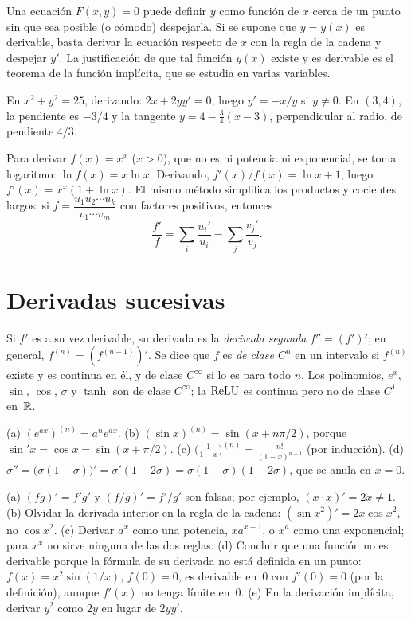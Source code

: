 Una ecuación $F(x,y)=0$ puede definir $y$ como función de $x$ cerca de un punto sin que sea posible (o cómodo) despejarla. Si se supone que $y=y(x)$ es derivable, basta derivar la ecuación respecto de $x$ con la regla de la cadena y despejar $y'$. La justificación de que tal función $y(x)$ existe y es derivable es el teorema de la función implícita, que se estudia en varias variables.

\begin{ejemplo}[Circunferencia]\label{ej:implicita}
En $x^{2}+y^{2}=25$, derivando: $2x+2yy'=0$, luego $y'=-x/y$ si $y\ne0$. En $(3,4)$, la pendiente es $-3/4$ y la tangente $y=4-\tfrac34(x-3)$, perpendicular al radio, de pendiente $4/3$.
\end{ejemplo}

\begin{ejemplo}\label{ej:logaritmica}
Para derivar $f(x)=x^{x}$ ($x>0$), que no es ni potencia ni exponencial, se toma logaritmo: $\ln f(x)=x\ln x$. Derivando, $f'(x)/f(x)=\ln x+1$, luego $f'(x)=x^{x}(1+\ln x)$. El mismo método simplifica los productos y cocientes largos: si $f=\dfrac{u_1u_2\cdots u_k}{v_1\cdots v_m}$ con factores positivos, entonces
\[
\frac{f'}{f}=\sum_{i}\frac{u_i'}{u_i}-\sum_{j}\frac{v_j'}{v_j}.
\]
\end{ejemplo}

\section{Derivadas sucesivas}

Si $f'$ es a su vez derivable, su derivada es la \emph{derivada segunda} $f''=(f')'$; en general, $f^{(n)}=(f^{(n-1)})'$. Se dice que $f$ es \emph{de clase $C^{n}$} en un intervalo si $f^{(n)}$ existe y es continua en él, y de clase $C^{\infty}$ si lo es para todo $n$. Los polinomios, $e^{x}$, $\sin$, $\cos$, $\sigma$ y $\tanh$ son de clase $C^{\infty}$; la $\operatorname{ReLU}$ es continua pero no de clase $C^{1}$ en~$\mathbb{R}$.

\begin{ejemplo}\label{ej:sucesivas}
(a) $(e^{ax})^{(n)}=a^{n}e^{ax}$. (b) $(\sin x)^{(n)}=\sin(x+n\pi/2)$, porque $\sin'x=\cos x=\sin(x+\pi/2)$. (c) $\bigl(\tfrac{1}{1-x}\bigr)^{(n)}=\tfrac{n!}{(1-x)^{n+1}}$ (por inducción). (d) $\sigma''=\bigl(\sigma(1-\sigma)\bigr)'=\sigma'(1-2\sigma)=\sigma(1-\sigma)(1-2\sigma)$, que se anula en $x=0$.
\end{ejemplo}

\begin{observacion}\label{obs:4-errores}
(a) $(fg)'=f'g'$ y $(f/g)'=f'/g'$ son falsas; por ejemplo, $(x\cdot x)'=2x\ne1$.
(b) Olvidar la derivada interior en la regla de la cadena: $(\sin x^{2})'=2x\cos x^{2}$, no $\cos x^{2}$.
(c) Derivar $a^{x}$ como una potencia, $xa^{x-1}$, o $x^{a}$ como una exponencial; para $x^{x}$ no sirve ninguna de las dos reglas.
(d) Concluir que una función no es derivable porque la fórmula de su derivada no está definida en un punto: $f(x)=x^{2}\sin(1/x)$, $f(0)=0$, es derivable en~0 con $f'(0)=0$ (por la definición), aunque $f'(x)$ no tenga límite en~0.
(e) En la derivación implícita, derivar $y^{2}$ como $2y$ en lugar de $2yy'$.
\end{observacion}

